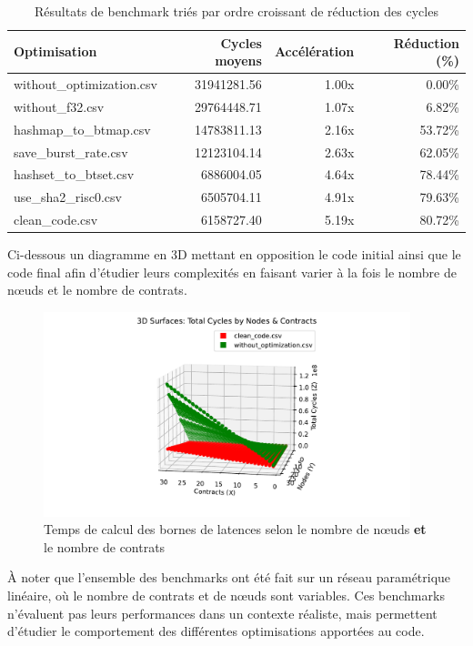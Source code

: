 \documentclass[12pt]{report}
\begin{document}
\begin{table}[h!]
\centering
\begin{tabular}{|l|r|r|r|}
\hline
\textbf{Optimisation} & \textbf{Cycles moyens} & \textbf{Accélération} & \textbf{Réduction (\%)} \\
\hline
without\_optimization.csv & 31941281.56 & 1.00x & 0.00\% \\
without\_f32.csv       & 29764448.71 & 1.07x & 6.82\%  \\
hashmap\_to\_btmap.csv & 14783811.13 & 2.16x & 53.72\% \\
save\_burst\_rate.csv  & 12123104.14 & 2.63x & 62.05\% \\
hashset\_to\_btset.csv &  6886004.05 & 4.64x & 78.44\% \\
use\_sha2\_risc0.csv   &  6505704.11 & 4.91x & 79.63\% \\
clean\_code.csv        &  6158727.40 & 5.19x & 80.72\% \\
\hline
\end{tabular}
\caption{Résultats de benchmark triés par ordre croissant de réduction des cycles}
\end{table}

\bigskip

Ci-dessous un diagramme en 3D mettant en opposition le code initial ainsi
que le code final afin d'étudier leurs complexités en faisant varier
à la fois le nombre de nœuds et le nombre de contrats.

\begin{figure}[H]
    \centering
    \includegraphics[width=0.95\textwidth]{benchmark_3D.pdf}
    \caption{Temps de calcul des bornes de latences selon le nombre de nœuds \textbf{et} le nombre de contrats}
\end{figure}

À noter que l'ensemble des benchmarks ont été fait sur un réseau paramétrique linéaire,
où le nombre de contrats et de nœuds sont variables. Ces benchmarks n'évaluent pas
leurs performances dans un contexte réaliste, mais permettent d'étudier le
comportement des différentes optimisations apportées au code.
\end{document}
